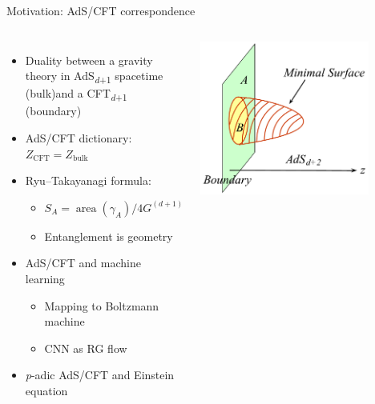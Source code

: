 \documentclass{fdubeamer}
\newcommand{\1}{\mathbb{1}}
\begin{document}
\begin{frame}{Motivation: AdS/CFT correspondence}

\begin{columns}[c]


    \begin{itemize}
      \item Duality between a gravity theory in AdS\textsubscript{\textit{d}+1} spacetime (bulk)and a CFT\textsubscript{\textit{d}+1} (boundary)
      \item AdS/CFT dictionary: $Z_{\mathrm{CFT}}=Z_{\mathrm{bulk}}$
      \item Ryu--Takayanagi formula:

        \begin{itemize}
          \item $S_A = \operatorname{area}(\gamma_A) / 4G^{(d+1)}$
          \item Entanglement is geometry
        \end{itemize}

      \item AdS/CFT and machine learning

        \begin{itemize}
          \item Mapping to Boltzmann machine
          \item CNN as RG flow
        \end{itemize}

      \item \textit{p}-adic AdS/CFT and Einstein equation
    \end{itemize}


    \centering
    \includegraphics[width=0.8\textwidth]{images/rt-formula.pdf}

\end{columns}


\end{frame}
\end{document}

